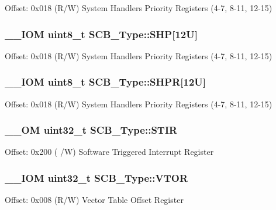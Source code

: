 Offset\-: 0x018 (R/\-W) System Handlers Priority Registers (4-\/7, 8-\/11, 12-\/15) \hypertarget{struct_s_c_b___type_a9b05f74580fc93daa7fe2f0e1c9c5663}{
\subsubsection[{S\-H\-P}]{\setlength{\rightskip}{0pt plus 5cm}\-\_\-\-\_\-\-I\-O\-M uint8\-\_\-t S\-C\-B\-\_\-\-Type\-::\-S\-H\-P\mbox{[}12\-U\mbox{]}}}\label{struct_s_c_b___type_a9b05f74580fc93daa7fe2f0e1c9c5663}
Offset\-: 0x018 (R/\-W) System Handlers Priority Registers (4-\/7, 8-\/11, 12-\/15) \hypertarget{struct_s_c_b___type_afdab23abd301033bb318c7b188b377db}{
\subsubsection[{S\-H\-P\-R}]{\setlength{\rightskip}{0pt plus 5cm}\-\_\-\-\_\-\-I\-O\-M uint8\-\_\-t S\-C\-B\-\_\-\-Type\-::\-S\-H\-P\-R\mbox{[}12\-U\mbox{]}}}\label{struct_s_c_b___type_afdab23abd301033bb318c7b188b377db}
Offset\-: 0x018 (R/\-W) System Handlers Priority Registers (4-\/7, 8-\/11, 12-\/15) \hypertarget{struct_s_c_b___type_ad70825dd0869b7ccd07fb2b8680fcdb6}{
\subsubsection[{S\-T\-I\-R}]{\setlength{\rightskip}{0pt plus 5cm}\-\_\-\-\_\-\-O\-M uint32\-\_\-t S\-C\-B\-\_\-\-Type\-::\-S\-T\-I\-R}}\label{struct_s_c_b___type_ad70825dd0869b7ccd07fb2b8680fcdb6}
Offset\-: 0x200 ( /\-W) Software Triggered Interrupt Register \hypertarget{struct_s_c_b___type_a187a4578e920544ed967f98020fb8170}{
\subsubsection[{V\-T\-O\-R}]{\setlength{\rightskip}{0pt plus 5cm}\-\_\-\-\_\-\-I\-O\-M uint32\-\_\-t S\-C\-B\-\_\-\-Type\-::\-V\-T\-O\-R}}\label{struct_s_c_b___type_a187a4578e920544ed967f98020fb8170}
Offset\-: 0x008 (R/\-W) Vector Table Offset Register 

